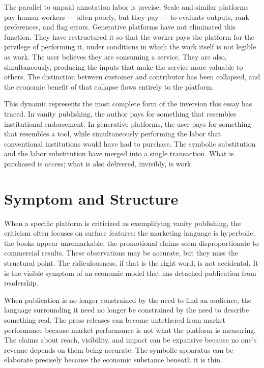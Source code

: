 \documentclass[12pt, a4paper]{article}
\begin{document}
The parallel to unpaid annotation labor is precise. Scale and similar platforms pay human workers — often poorly, but they pay — to evaluate outputs, rank preferences, and flag errors. Generative platforms have not eliminated this function. They have restructured it so that the worker pays the platform for the privilege of performing it, under conditions in which the work itself is not legible as work. The user believes they are consuming a service. They are also, simultaneously, producing the inputs that make the service more valuable to others. The distinction between customer and contributor has been collapsed, and the economic benefit of that collapse flows entirely to the platform.

This dynamic represents the most complete form of the inversion this essay has traced. In vanity publishing, the author pays for something that resembles institutional endorsement. In generative platforms, the user pays for something that resembles a tool, while simultaneously performing the labor that conventional institutions would have had to purchase. The symbolic substitution and the labor substitution have merged into a single transaction. What is purchased is access; what is also delivered, invisibly, is work.

\section{Symptom and Structure}

When a specific platform is criticized as exemplifying vanity publishing, the criticism often focuses on surface features: the marketing language is hyperbolic, the books appear unremarkable, the promotional claims seem disproportionate to commercial results. These observations may be accurate, but they miss the structural point. The ridiculousness, if that is the right word, is not accidental. It is the visible symptom of an economic model that has detached publication from readership.

When publication is no longer constrained by the need to find an audience, the language surrounding it need no longer be constrained by the need to describe something real. The press releases can become untethered from market performance because market performance is not what the platform is measuring. The claims about reach, visibility, and impact can be expansive because no one's revenue depends on them being accurate. The symbolic apparatus can be elaborate precisely because the economic substance beneath it is thin.
\end{document}
